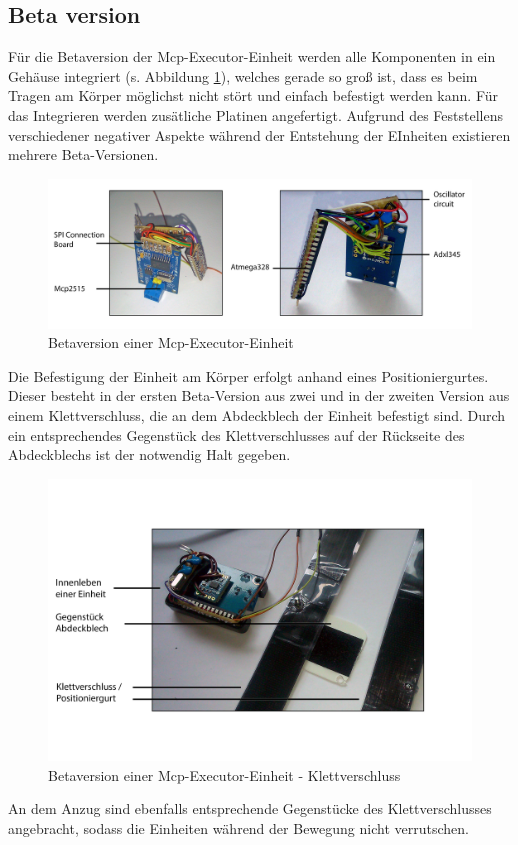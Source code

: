 \subsection{Beta version}
\label{kap:McpExecutorBetaversion}
Für die Betaversion der Mcp-Executor-Einheit werden alle Komponenten in ein Gehäuse integriert (s. Abbildung \ref{fig:McpExecutorBeta}), welches gerade so groß ist, dass es beim Tragen am Körper möglichst nicht stört und einfach befestigt werden kann. Für das Integrieren werden zusätliche Platinen angefertigt.
\newline
Aufgrund des Feststellens verschiedener negativer Aspekte während der Entstehung der EInheiten existieren mehrere Beta-Versionen.

\begin{figure}[H]
	\centering
	\includegraphics[width=1.0\linewidth]{Bilder/McpExecutor_BetaDetail}
	\caption[Betaversion einer Mcp-Executor-Einheit]{Betaversion einer Mcp-Executor-Einheit}
	\label{fig:McpExecutorBeta}
\end{figure}

Die Befestigung der Einheit am Körper erfolgt anhand eines Positioniergurtes. Dieser besteht in der ersten Beta-Version aus zwei und in der zweiten Version aus einem Klettverschluss, die an dem Abdeckblech der Einheit befestigt sind. Durch ein entsprechendes Gegenstück des Klettverschlusses auf der Rückseite des Abdeckblechs ist der notwendig Halt gegeben.
%
%
\begin{figure}[H]
	\centering
	\includegraphics[width=1.0\linewidth]{Bilder/McpExecutor2515Klettverschluss}
	\caption[Betaversion einer Mcp-Executor-Einheit - Klettverschluss]{Betaversion einer Mcp-Executor-Einheit - Klettverschluss}
	\label{fig:McpExecutorBetaKlettverschluss}
\end{figure}

An dem Anzug sind ebenfalls entsprechende Gegenstücke des Klettverschlusses angebracht, sodass die Einheiten während der Bewegung nicht verrutschen. 

